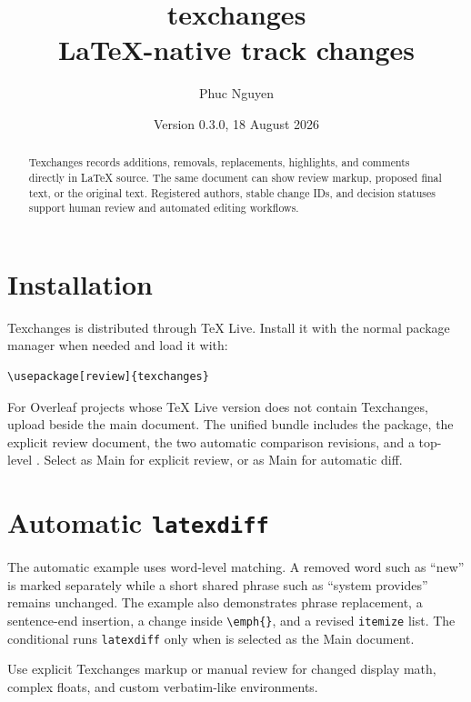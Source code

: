 \documentclass[11pt]{article}
\title{\textsf{texchanges}\\\large LaTeX-native track changes}
\author{Phuc Nguyen}
\date{Version 0.3.0, 18 August 2026}
\begin{document}
\maketitle

\begin{abstract}
Texchanges records additions, removals, replacements, highlights, and comments
directly in LaTeX source. The same document can show review markup, proposed
final text, or the original text. Registered authors, stable change IDs, and
decision statuses support human review and automated editing workflows.
\end{abstract}

\tableofcontents

\section{Installation}

Texchanges is distributed through TeX Live. Install it with the normal package
manager when needed and load it with:

\begin{lstlisting}
\usepackage[review]{texchanges}
\end{lstlisting}

For Overleaf projects whose TeX Live version does not contain Texchanges,
upload  beside the main document. The unified
 bundle includes the package, the explicit
review document, the two automatic comparison revisions, and a top-level
. Select  as Main for
explicit review, or  as Main for automatic diff.

\section{Automatic \texttt{latexdiff}}

The automatic example uses word-level matching. A removed word such as
``new'' is marked separately while a short shared phrase such as ``system
provides'' remains unchanged. The example also demonstrates phrase
replacement, a sentence-end insertion, a change inside \verb|\emph{}|, and a
revised \texttt{itemize} list. The conditional  runs
\texttt{latexdiff} only when  is selected as the
Main document.

Use explicit Texchanges markup or manual review for changed display math,
complex floats, and custom verbatim-like environments.
\end{document}

